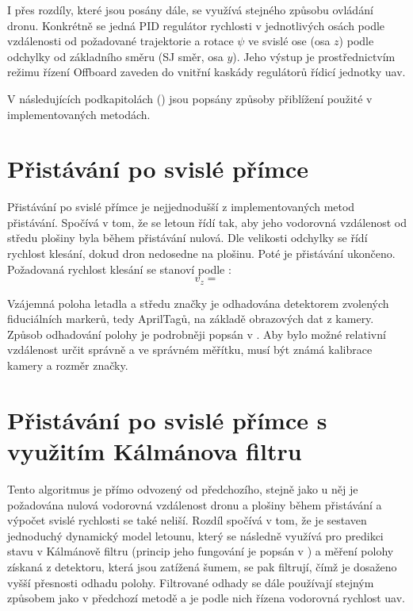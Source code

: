     I přes rozdíly, které jsou posány dále, se využívá stejného způsobu ovládání dronu. Konkrétně se jedná PID regulátor rychlosti v jednotlivých osách podle vzdálenosti od požadované trajektorie a rotace $\psi$ ve svislé ose (osa $z$) podle odchylky od základního směru (SJ směr, osa $y$). Jeho výstup je prostřednictvím režimu řízení Offboard zaveden do vnitřní kaskády regulátorů řídicí jednotky \acrshort{uav}.
    
    V následujících podkapitolách () jsou popsány způsoby přiblížení použité v implementovaných metodách.

    \section{Přistávání po svislé přímce} \label{sec:offboardpid}
        Přistávání po svislé přímce je nejjednodušší z implementovaných metod přistávání. Spočívá v tom, že se letoun řídí tak, aby jeho vodorovná vzdálenost od středu plošiny byla během přistávání nulová. Dle velikosti odchylky se řídí rychlost klesání, dokud dron nedosedne na plošinu. Poté je přistávání ukončeno. Požadovaná rychlost klesání se stanoví podle :
        \begin{equation} \label{eq:vz}
            v_z = %
        \end{equation}

        Vzájemná poloha letadla a středu značky je odhadována detektorem zvolených fiduciálních markerů, tedy AprilTagů, na základě obrazových dat z kamery. Způsob odhadování polohy je podrobněji popsán v . Aby bylo možné relativní vzdálenost určit správně a ve správném měřítku, musí být známá kalibrace kamery a rozměr značky.
    \section{Přistávání po svislé přímce s využitím Kálmánova filtru} \label{sec:kalmanoffboardpid}
        Tento algoritmus je přímo odvozený od předchozího, stejně jako u něj je požadována nulová vodorovná vzdálenost dronu a plošiny během přistávání a výpočet svislé rychlosti se také neliší. Rozdíl spočívá v tom, že je sestaven jednoduchý dynamický model letounu, který se následně využívá pro predikci stavu v Kálmánově filtru (princip jeho fungování je popsán v ) a měření polohy získaná z detektoru, která jsou zatížená šumem, se pak filtrují, čímž je dosaženo vyšší přesnosti odhadu polohy. Filtrované odhady se dále používají stejným způsobem jako v předchozí metodě a je podle nich řízena vodorovná rychlost \acrshort{uav}.

